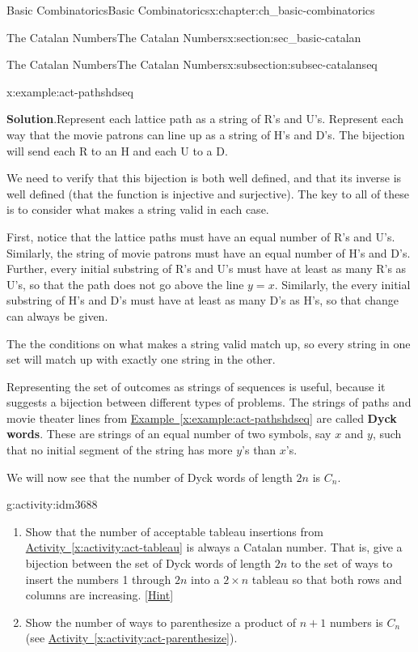 \documentclass[oneside,10pt,]{book}
\newcommand{\terminology}[1]{\textbf{#1}}
\numberwithin{equation}{chapter}
\begin{document}
\begin{chapterptx}{Basic Combinatorics}{}{Basic Combinatorics}{}{}{x:chapter:ch_basic-combinatorics}
\begin{sectionptx}{The Catalan Numbers}{}{The Catalan Numbers}{}{}{x:section:sec_basic-catalan}
\begin{subsectionptx}{The Catalan Numbers}{}{The Catalan Numbers}{}{}{x:subsection:subsec-catalanseq}
\begin{example}{}{x:example:act-pathshdseq}
\par\smallskip%
\noindent\textbf{Solution}.\hypertarget{g:solution:idm3672}{}\quad{}Represent each lattice path as a string of R's and U's.  Represent each way that the movie patrons can line up as a string of H's and D's.  The bijection will send each R to an H and each U to a D.%
\par
We need to verify that this bijection is both well defined, and that its inverse is well defined (that the function is injective and surjective).  The key to all of these is to consider what makes a string valid in each case.%
\par
First, notice that the lattice paths must have an equal number of R's and U's.  Similarly, the string of movie patrons must have an equal number of H's and D's. Further, every initial substring of R's and U's must have at least as many R's as U's, so that the path does not go above the line \(y=x\).  Similarly, the every initial substring of H's and D's must have at least as many D's as H's, so that change can always be given.%
\par
The the conditions on what makes a string valid match up, so every string in one set will match up with exactly one string in the other.%
\end{example}
Representing the set of outcomes as strings of sequences is useful, because it suggests a bijection between different types of problems.  The strings of paths and movie theater lines from \hyperref[x:example:act-pathshdseq]{Example~\ref{x:example:act-pathshdseq}} are called \terminology{Dyck words}.  These are strings of an equal number of two symbols, say \(x\) and \(y\), such that no initial segment of the string has more \(y\)'s than \(x\)'s.%
\par
We will now see that the number of Dyck words of length \(2n\) is \(C_n\).%
\begin{activity}{}{g:activity:idm3688}%
\begin{enumerate}[font=\bfseries,label=(\alph*),ref=\alph*]
\item{}Show that the number of acceptable tableau insertions from \hyperref[x:activity:act-tableau]{Activity~\ref{x:activity:act-tableau}} is always a Catalan number.  That is, give a bijection between the set of Dyck words of length \(2n\) to the set of ways to insert the numbers 1 through \(2n\) into a \(2\times n\) tableau so that both rows and columns are increasing.%
\space\hspace*{0pt}\hfill{\tiny\hyperlink{g:hint:idm3696-back}{[Hint]}}\item{}Show the number of ways to parenthesize a product of \(n+1\) numbers is \(C_n\) (see \hyperref[x:activity:act-parenthesize]{Activity~\ref{x:activity:act-parenthesize}}).%

\end{enumerate}
\end{activity}
\end{subsectionptx}
\end{sectionptx}
\end{chapterptx}
\end{document}
